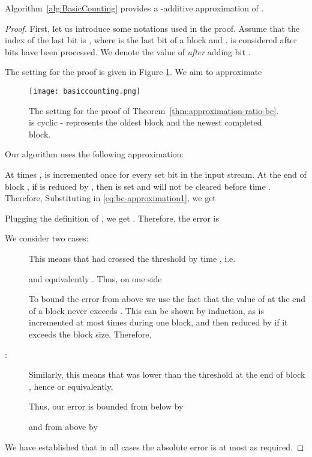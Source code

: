 \begin{theorem} \label{thm:approximation-ratio-bc}
Algorithm~\ref{alg:BasicCounting} provides a -additive approximation of \bc{}.
\end{theorem}
\begin{proof}
First, let us introduce some notations used in the proof.
Assume that the index of the last bit is , where  is the last bit of a block and .
 is considered after  bits have been processed.
We denote  the value of  \emph{after} adding bit .

The setting for the proof is given in Figure \ref{fig:basic-counting}.
We aim to approximate

\begin{figure}[t!]
\centering
\texttt{[image: basiccounting.png]}
\caption{The setting for the proof of Theorem~\ref{thm:approximation-ratio-bc}.  is cyclic -  represents the oldest block and  the newest completed block.}
\label{fig:basic-counting}
\end{figure}
Our algorithm uses the following approximation:

At times ,  is incremented once for every set bit in the input stream.
At the end of block , if  is reduced by , then  is set and will not be cleared before time .
Therefore, 
Substituting  in \eqref{eq:bc-approximation1}, we get


Plugging
the definition of , we get
.
Therefore, the error is

\noindent
We consider two cases:
\begin{description}
\item [] This means that  had crossed the threshold by time , i.e.

and equivalently .
  Thus, on one side

To bound the error from above we use the fact that the value of  at the end of a block never exceeds .
This can be shown by induction, as  is incremented at most  times during one block, and then reduced by  if it exceeds the block size.
Therefore,

\item [:] Similarly, this means that  was lower than the threshold at the end of block , hence
     or equivalently,
    
    Thus, our error is bounded from below by
    
    and from above by
    
\end{description}

We have established that in all cases the absolute error is at most  as required.
\end{proof}



